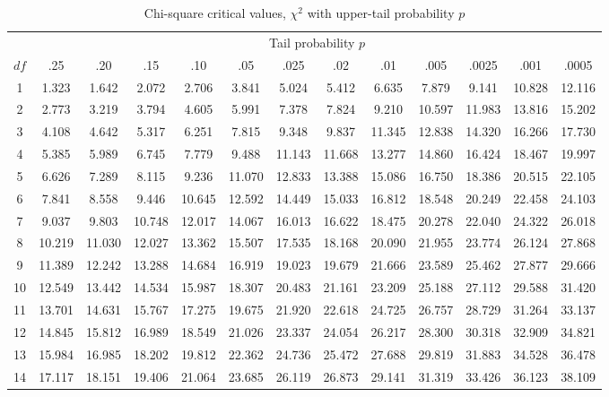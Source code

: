 \begin{table}[H]
\centering
\footnotesize
\setlength{\tabcolsep}{3.5pt}
\caption{Chi-square critical values, $\chi^2$ with upper-tail probability $p$}
\label{tab:chisq-full}
\begin{tabular}{c|cccccccccccc}
 & \multicolumn{12}{c}{Tail probability $p$} \\
$df$ & .25 & .20 & .15 & .10 & .05 & .025 & .02 & .01 & .005 & .0025 & .001 & .0005 \\
\hline
1 & 1.323 & 1.642 & 2.072 & 2.706 & 3.841 & 5.024 & 5.412 & 6.635 & 7.879 & 9.141 & 10.828 & 12.116 \\
2 & 2.773 & 3.219 & 3.794 & 4.605 & 5.991 & 7.378 & 7.824 & 9.210 & 10.597 & 11.983 & 13.816 & 15.202 \\
3 & 4.108 & 4.642 & 5.317 & 6.251 & 7.815 & 9.348 & 9.837 & 11.345 & 12.838 & 14.320 & 16.266 & 17.730 \\
4 & 5.385 & 5.989 & 6.745 & 7.779 & 9.488 & 11.143 & 11.668 & 13.277 & 14.860 & 16.424 & 18.467 & 19.997 \\
5 & 6.626 & 7.289 & 8.115 & 9.236 & 11.070 & 12.833 & 13.388 & 15.086 & 16.750 & 18.386 & 20.515 & 22.105 \\
6 & 7.841 & 8.558 & 9.446 & 10.645 & 12.592 & 14.449 & 15.033 & 16.812 & 18.548 & 20.249 & 22.458 & 24.103 \\
7 & 9.037 & 9.803 & 10.748 & 12.017 & 14.067 & 16.013 & 16.622 & 18.475 & 20.278 & 22.040 & 24.322 & 26.018 \\
8 & 10.219 & 11.030 & 12.027 & 13.362 & 15.507 & 17.535 & 18.168 & 20.090 & 21.955 & 23.774 & 26.124 & 27.868 \\
9 & 11.389 & 12.242 & 13.288 & 14.684 & 16.919 & 19.023 & 19.679 & 21.666 & 23.589 & 25.462 & 27.877 & 29.666 \\
10 & 12.549 & 13.442 & 14.534 & 15.987 & 18.307 & 20.483 & 21.161 & 23.209 & 25.188 & 27.112 & 29.588 & 31.420 \\
11 & 13.701 & 14.631 & 15.767 & 17.275 & 19.675 & 21.920 & 22.618 & 24.725 & 26.757 & 28.729 & 31.264 & 33.137 \\
12 & 14.845 & 15.812 & 16.989 & 18.549 & 21.026 & 23.337 & 24.054 & 26.217 & 28.300 & 30.318 & 32.909 & 34.821 \\
13 & 15.984 & 16.985 & 18.202 & 19.812 & 22.362 & 24.736 & 25.472 & 27.688 & 29.819 & 31.883 & 34.528 & 36.478 \\
14 & 17.117 & 18.151 & 19.406 & 21.064 & 23.685 & 26.119 & 26.873 & 29.141 & 31.319 & 33.426 & 36.123 & 38.109 \\

\end{tabular}
\end{table}

